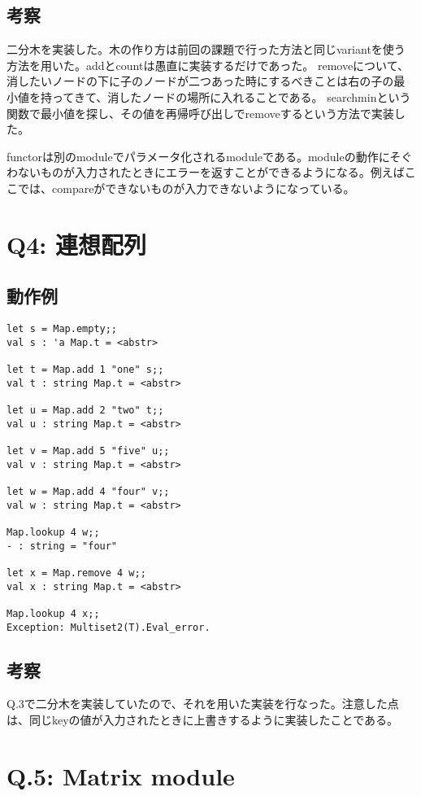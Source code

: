 \documentclass[uplatex,12pt]{jsarticle}
\begin{document}
\subsection{考察}
二分木を実装した。木の作り方は前回の課題で行った方法と同じvariantを使う方法を用いた。addとcountは愚直に実装するだけであった。
removeについて、消したいノードの下に子のノードが二つあった時にするべきことは右の子の最小値を持ってきて、消したノードの場所に入れることである。
searchminという関数で最小値を探し、その値を再帰呼び出しでremoveするという方法で実装した。

functorは別のmoduleでパラメータ化されるmoduleである。moduleの動作にそぐわないものが入力されたときにエラーを返すことができるようになる。例えばここでは、compareができないものが入力できないようになっている。

\section{Q4: 連想配列}
\subsection{動作例}

\begin{lstlisting}[caption=動作例]
let s = Map.empty;;
val s : 'a Map.t = <abstr>

let t = Map.add 1 "one" s;;
val t : string Map.t = <abstr>

let u = Map.add 2 "two" t;;
val u : string Map.t = <abstr>

let v = Map.add 5 "five" u;;
val v : string Map.t = <abstr>

let w = Map.add 4 "four" v;;
val w : string Map.t = <abstr>

Map.lookup 4 w;;
- : string = "four"

let x = Map.remove 4 w;;
val x : string Map.t = <abstr>

Map.lookup 4 x;;
Exception: Multiset2(T).Eval_error.
\end{lstlisting}

\subsection{考察}
Q.3で二分木を実装していたので、それを用いた実装を行なった。注意した点は、同じkeyの値が入力されたときに上書きするように実装したことである。

\section{Q.5: Matrix module}
\end{document}
